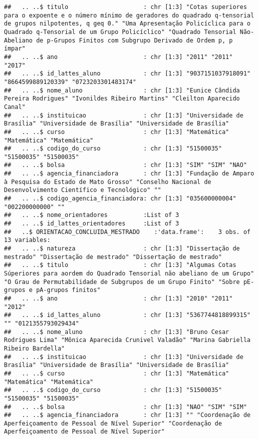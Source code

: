 \documentclass[]{article}
\begin{document}
\begin{verbatim}
##   .. ..$ titulo                     : chr [1:3] "Cotas superiores para o expoente e o número mínimo de geradores do quadrado q-tensorial de grupos nilpotentes, q geq 0." "Uma Apresentação Policíclica para o Quadrado q-Tensorial de um Grupo Policíclico" "Quadrado Tensorial Não-Abeliano de p-Grupos Finitos com Subgrupo Derivado de Ordem p, p ímpar"
##   .. ..$ ano                        : chr [1:3] "2011" "2011" "2017"
##   .. ..$ id_lattes_aluno            : chr [1:3] "9037151037918091" "8664599889120339" "0723203301483174"
##   .. ..$ nome_aluno                 : chr [1:3] "Eunice Cândida Pereira Rodrigues" "Ivonildes Ribeiro Martins" "Cleilton Aparecido Canal"
##   .. ..$ instituicao                : chr [1:3] "Universidade de Brasília" "Universidade de Brasília" "Universidade de Brasília"
##   .. ..$ curso                      : chr [1:3] "Matemática" "Matemática" "Matemática"
##   .. ..$ codigo_do_curso            : chr [1:3] "51500035" "51500035" "51500035"
##   .. ..$ bolsa                      : chr [1:3] "SIM" "SIM" "NAO"
##   .. ..$ agencia_financiadora       : chr [1:3] "Fundação de Amparo à Pesquisa do Estado de Mato Grosso" "Conselho Nacional de Desenvolvimento Científico e Tecnológico" ""
##   .. ..$ codigo_agencia_financiadora: chr [1:3] "035600000004" "002200000000" ""
##   .. ..$ nome_orientadores          :List of 3
##   .. ..$ id_lattes_orientadores     :List of 3
##   ..$ ORIENTACAO_CONCLUIDA_MESTRADO    :'data.frame':    3 obs. of  13 variables:
##   .. ..$ natureza                   : chr [1:3] "Dissertação de mestrado" "Dissertação de mestrado" "Dissertação de mestrado"
##   .. ..$ titulo                     : chr [1:3] "Algumas Cotas Súperiores para aordem do Quadrado Tensorial não abeliano de um Grupo" "O Grau de Permutabilidade de Subgrupos de um Grupo Finito" "Sobre pE-grupos e pA-grupos finitos"
##   .. ..$ ano                        : chr [1:3] "2010" "2011" "2012"
##   .. ..$ id_lattes_aluno            : chr [1:3] "5367744818899315" "" "0121355793029434"
##   .. ..$ nome_aluno                 : chr [1:3] "Bruno Cesar Rodrigues Lima" "Mônica Aparecida Crunivel Valadão" "Marina Gabriella Ribeiro Bardella"
##   .. ..$ instituicao                : chr [1:3] "Universidade de Brasília" "Universidade de Brasília" "Universidade de Brasília"
##   .. ..$ curso                      : chr [1:3] "Matemática" "Matemática" "Matemática"
##   .. ..$ codigo_do_curso            : chr [1:3] "51500035" "51500035" "51500035"
##   .. ..$ bolsa                      : chr [1:3] "NAO" "SIM" "SIM"
##   .. ..$ agencia_financiadora       : chr [1:3] "" "Coordenação de Aperfeiçoamento de Pessoal de Nível Superior" "Coordenação de Aperfeiçoamento de Pessoal de Nível Superior"

\end{verbatim}
\end{document}

